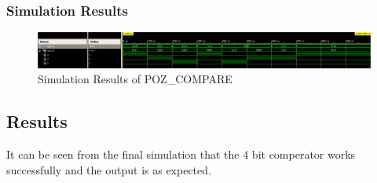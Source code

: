 \documentclass[table ]{article}
\begin{document}
\subsubsection*{Simulation Results}

\begin{figure}[H]
    \centering
    \includegraphics[width=\textwidth]{img/POS_COMPARE_SIM.png}
    \caption{Simulation Results of POZ\_COMPARE}

\end{figure}


\subsection*{Results}

It can be seen from the final simulation that the 4 bit comperator works successfully and the output is as expected. 
\end{document}
